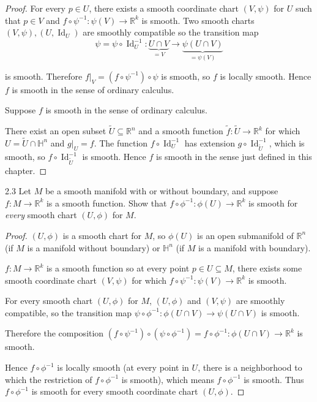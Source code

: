 \begin{proof}
    For every \( p \in U \), there exists a smooth coordinate chart \( (V, \psi) \) for \( U \) such that \( p \in V \) and \( f \circ \psi^{-1}: \psi(V) \to \mathbb{R}^{k} \) is smooth. Two smooth charts \( (V, \psi), (U, \operatorname{Id}_{U}) \) are smoothly compatible so the transition map
    \[
        \psi = \psi \circ \operatorname{Id}_{U}^{-1}: \underbrace{U \cap V}_{= V} \to \underbrace{\psi(U \cap V)}_{= \psi(V)}
    \]

    is smooth. Therefore \( f\vert_{V} = (f \circ \psi^{-1}) \circ \psi \) is smooth, so \( f \) is locally smooth. Hence \( f \) is smooth in the sense of ordinary calculus.

    Suppose \( f \) is smooth in the sense of ordinary calculus.

    There exist an open subset \( \widetilde{U} \subseteq \mathbb{R}^{n} \) and a smooth function \( \widetilde{f}: \widetilde{U} \to \mathbb{R}^{k} \) for which \( U = \widetilde{U} \cap \mathbb{H}^{n} \) and \( g\vert_{U} = f \). The function \( f \circ \operatorname{Id}_{U}^{-1} \) has extension \( g \circ \operatorname{Id}_{\widetilde{U}}^{-1} \), which is smooth, so \( f \circ \operatorname{Id}_{\widetilde{U}}^{-1} \) is smooth. Hence \( f \) is smooth in the sense just defined in this chapter.
\end{proof}

\begin{exercise}{2.3}
    Let \( M \) be a smooth manifold with or without boundary, and suppose \( f: M \to \mathbb{R}^{k} \) is a smooth function. Show that \( f \circ \phi^{-1}: \phi(U) \to \mathbb{R}^{k} \) is smooth for \textit{every} smooth chart \( (U, \phi) \) for \( M \).
\end{exercise}

\begin{proof}
    \( (U, \phi) \) is a smooth chart for \( M \), so \( \phi(U) \) is an open submanifold of \( \mathbb{R}^{n} \) (if \(M\) is a manifold without boundary) or \( \mathbb{H}^{n} \) (if \(M\) is a manifold with boundary).

    \( f: M \to \mathbb{R}^{k} \) is a smooth function so at every point \( p \in U \subseteq M \), there exists some smooth coordinate chart \( (V, \psi) \) for which \( f \circ \psi^{-1}: \psi(V) \to \mathbb{R}^{k} \) is smooth.

    For every smooth chart \( (U, \phi) \) for \( M \), \( (U, \phi) \) and \( (V, \psi) \) are smoothly compatible, so the transition map \( \psi \circ \phi^{-1}: \phi(U \cap V) \to \psi(U \cap V) \) is smooth.

    Therefore the composition \( (f \circ \psi^{-1}) \circ (\psi \circ \phi^{-1}) = f \circ \phi^{-1}: \phi(U \cap V) \to \mathbb{R}^{k} \) is smooth.

    Hence \( f \circ \phi^{-1} \) is locally smooth (at every point in \(U\), there is a neighborhood to which the restriction of \( f \circ \phi^{-1} \) is smooth), which means \( f \circ \phi^{-1} \) is smooth. Thus \( f \circ \phi^{-1} \) is smooth for every smooth coordinate chart \( (U, \phi) \).
\end{proof}

